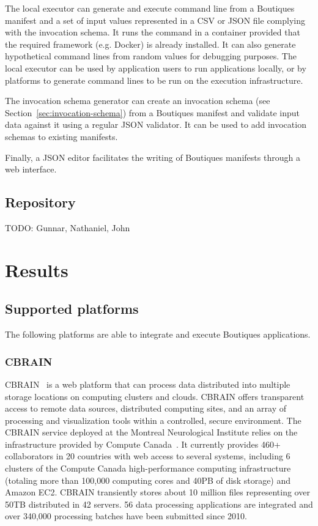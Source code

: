 \documentclass{article}
\newcommand{\todo}[1]{\color{red}TODO: #1\color{black}}
\newcommand{\boutiques}{Boutiques\xspace}
\begin{document}
The local executor can generate and execute command line from a
Boutiques manifest and a set of input values represented in a CSV or
JSON file complying with the invocation schema. It runs the command in
a container provided that the required framework (e.g. Docker) is
already installed. It can also generate hypothetical command lines
from random values for debugging purposes. The local executor can be
used by application users to run applications locally, or by platforms
to generate command lines to be run on the execution infrastructure.

The invocation schema generator can create an invocation schema (see
Section~\ref{sec:invocation-schema}) from a \boutiques manifest and
validate input data against it using a regular JSON validator. It can
be used to add invocation schemas to existing manifests.

Finally, a JSON editor facilitates the writing of \boutiques manifests
through a web interface.

\subsection{Repository}

\todo{Gunnar, Nathaniel, John}

\section{Results}
\label{sec:results}

\subsection{Supported platforms}

The following platforms are able to integrate and execute Boutiques
applications. 

\subsubsection{CBRAIN}

CBRAIN~\cite{SHER-14} is a web platform that can process data
distributed into multiple storage locations on computing clusters and
clouds. CBRAIN offers transparent access to remote data sources,
distributed computing sites, and an array of processing and
visualization tools within a controlled, secure environment.  The
CBRAIN service deployed at the Montreal Neurological Institute relies
on the infrastructure provided by Compute Canada~\cite{das2016mni}. It
currently provides 460+ collaborators in 20 countries with web access
to several systems, including 6 clusters of the Compute Canada
high-performance computing infrastructure (totaling more than 100,000
computing cores and 40PB of disk storage) and Amazon EC2. CBRAIN
transiently stores about 10 million files representing over 50TB
distributed in 42 servers. 56 data processing applications are integrated and
over 340,000 processing batches have been submitted since 2010.
\end{document}
